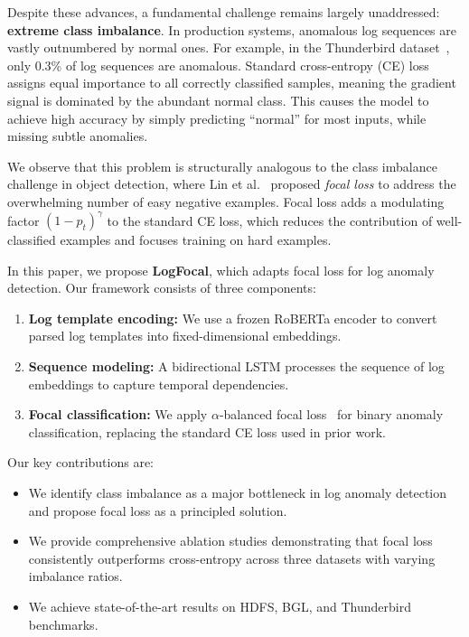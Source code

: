\documentclass[conference]{IEEEtran}
\begin{document}
Despite these advances, a fundamental challenge remains largely unaddressed:
\textbf{extreme class imbalance}.
In production systems, anomalous log sequences are vastly outnumbered by normal ones.
For example, in the Thunderbird dataset~\cite{oliner2007supercomputers},
only 0.3\% of log sequences are anomalous.
Standard cross-entropy (CE) loss assigns equal importance to all correctly classified samples,
meaning the gradient signal is dominated by the abundant normal class.
This causes the model to achieve high accuracy by simply predicting ``normal'' for most inputs,
while missing subtle anomalies.

We observe that this problem is structurally analogous to the class imbalance challenge
in object detection, where Lin et al.~\cite{lin2017focal} proposed \emph{focal loss}
to address the overwhelming number of easy negative examples.
Focal loss adds a modulating factor $(1 - p_t)^\gamma$ to the standard CE loss,
which reduces the contribution of well-classified examples and focuses training on hard examples.

In this paper, we propose \textbf{LogFocal}, which adapts focal loss for log anomaly detection.
Our framework consists of three components:
\begin{enumerate}
    \item \textbf{Log template encoding:} We use a frozen RoBERTa encoder
    to convert parsed log templates into fixed-dimensional embeddings.
    \item \textbf{Sequence modeling:} A bidirectional LSTM processes the sequence of log embeddings
    to capture temporal dependencies.
    \item \textbf{Focal classification:} We apply $\alpha$-balanced focal loss~\cite{lin2017focal}
    for binary anomaly classification, replacing the standard CE loss used in prior work.
\end{enumerate}

Our key contributions are:
\begin{itemize}
    \item We identify class imbalance as a major bottleneck in log anomaly detection
    and propose focal loss as a principled solution.
    \item We provide comprehensive ablation studies demonstrating that focal loss
    consistently outperforms cross-entropy across three datasets with varying imbalance ratios.
    \item We achieve state-of-the-art results on HDFS, BGL, and Thunderbird benchmarks.
\end{itemize}
\end{document}
